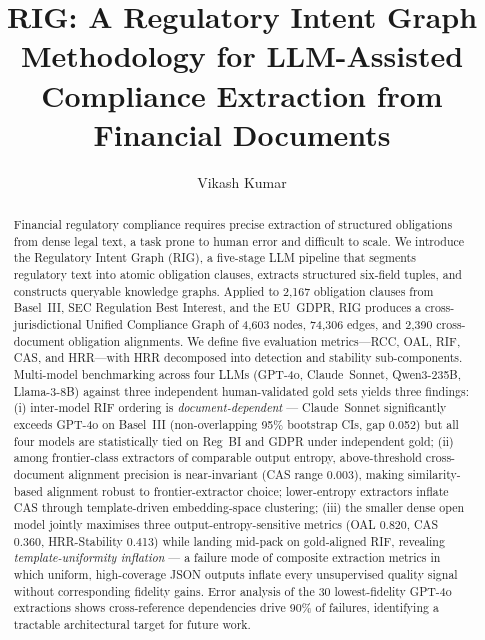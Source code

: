 \documentclass{article}
\title{RIG: A Regulatory Intent Graph Methodology for LLM-Assisted
Compliance Extraction from Financial Documents}
\author[1*]{Vikash Kumar}
\affil[1]{Independent Researcher, Austin, Texas, USA.}
\affil[*]{Address correspondence to: vikash.singh261@gmail.com}
\date{}
\begin{document}
\begin{nolinenumbers}
\maketitle
\end{nolinenumbers}
\linenumbers

\begin{abstract}
Financial regulatory compliance requires precise extraction of
structured obligations from dense legal text, a task prone to human
error and difficult to scale. We introduce the Regulatory Intent
Graph (RIG), a five-stage LLM pipeline that segments regulatory text
into atomic obligation clauses, extracts structured six-field
tuples, and constructs queryable knowledge graphs. Applied to 2{,}167
obligation clauses from Basel~III, SEC Regulation Best Interest, and
the EU~GDPR, RIG produces a cross-jurisdictional Unified Compliance
Graph of 4{,}603 nodes, 74{,}306 edges, and 2{,}390 cross-document
obligation alignments. We define five evaluation metrics---RCC, OAL,
RIF, CAS, and HRR---with HRR decomposed into detection and stability
sub-components. Multi-model benchmarking across four LLMs (GPT-4o, Claude~Sonnet,
Qwen3-235B, Llama-3-8B) against three independent human-validated
gold sets yields three findings: (i) inter-model RIF ordering is
\emph{document-dependent} --- Claude~Sonnet significantly exceeds
GPT-4o on Basel~III (non-overlapping 95\% bootstrap CIs, gap 0.052)
but all four models are statistically tied on Reg~BI and GDPR under
independent gold; (ii) among frontier-class extractors of comparable
output entropy, above-threshold cross-document alignment precision
is near-invariant (CAS range 0.003), making similarity-based
alignment robust to frontier-extractor choice; lower-entropy
extractors inflate CAS through template-driven embedding-space
clustering; (iii) the smaller dense open model jointly maximises
three output-entropy-sensitive metrics (OAL 0.820, CAS 0.360,
HRR-Stability 0.413) while landing mid-pack on gold-aligned RIF,
revealing \emph{template-uniformity inflation} --- a failure mode of
composite extraction metrics in which uniform, high-coverage JSON
outputs inflate every unsupervised quality signal without
corresponding fidelity gains. Error analysis of the 30 lowest-fidelity GPT-4o
extractions shows cross-reference dependencies drive 90\% of
failures, identifying a tractable architectural target for future
work.
\end{abstract}
\end{document}
